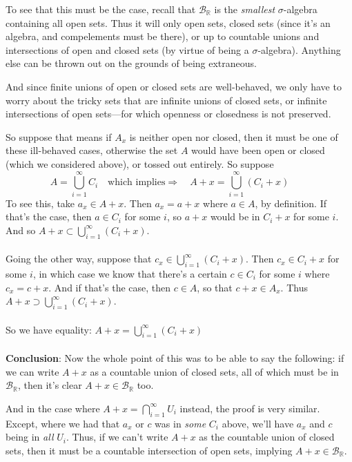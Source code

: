 \documentclass[12pt]{article}
\theoremstyle{plain}
\theoremstyle{definition}
\theoremstyle{remark}
\begin{document}
\begin{enumerate}
\begin{itemize}
    To see that this must be the case, recall that $\mathscr{B}_\mathbb{R}$ is the \emph{smallest} $\sigma$-algebra containing all open sets. Thus it will only open sets, closed sets (since it's an algebra, and compelements must be there), or up to countable unions and intersections of open and closed sets (by virtue of being a $\sigma$-algebra).  Anything else can be thrown out on the grounds of being extraneous.

    And since finite unions of open or closed sets are well-behaved, we only have to worry about the tricky sets that are infinite unions of closed sets, or infinite intersections of open sets---for which openness or closedness is not preserved.

    So suppose that means if $A_x$ is neither open nor closed, then it must be one of these ill-behaved cases, otherwise the set $A$ would have been open or closed (which we considered above), or tossed out entirely. So suppose 
    \[
        A = \bigcup^\infty_{i=1} C_i \quad
        \text{which implies} \Rightarrow\quad
        A+x = \bigcup^\infty_{i=1} (C_i+x) \qquad
    \]
    To see this, take $a_x \in A+x$. Then $a_x = a + x$ where $a\in A$, by definition. If that's the case, then $a\in C_i$ for some $i$, so $a + x$ would be in $C_i + x$ for some $i$. And so $A+x \subset \bigcup^\infty_{i=1}(C_i + x)$.
    \\
    \\
    Going the other way, suppose that $c_x \in \bigcup^\infty_{i=1} (C_i+x)$. Then $c_x \in C_i +x$ for some $i$, in which case we know that there's a certain $c\in C_i$ for some $i$ where $c_x=c+x$. And if that's the case, then $c\in A$, so that $c+x\in A_x$. Thus $A+x \supset \bigcup^\infty_{i=1}(C_i + x)$.
\\  
\\
    So we have equality: $A+x = \bigcup^\infty_{i=1}(C_i + x)$
\\
\\
\textbf{Conclusion}: Now the whole point of this was to be able to say the following: if we can write $A+x$ as a countable union of closed sets, all of which must be in $\mathscr{B}_\mathbb{R}$, then it's clear $A+x \in \mathscr{B}_\mathbb{R}$ too. 

And in the case where $A+x= \bigcap^\infty_{i=1} U_i$ instead, the proof is very similar. Except, where we had that $a_x$ or $c$ was in \emph{some} $C_i$ above, we'll have $a_x$ and $c$ being in \emph{all} $U_i$. Thus, if we can't write $A+x$ as the countable union of closed sets, then it must be a countable intersection of open sets, implying $A+x\in\mathscr{B}_\mathbb{R}$.


\end{itemize}

\end{enumerate}
\end{document}
